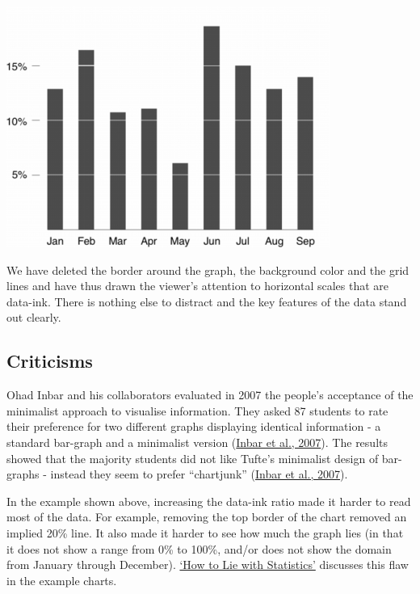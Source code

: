 \documentclass[
]{book}
\begin{document}
\includegraphics{imgs/high_data_ink_ratio.png}

We have deleted the border around the graph, the background color and the grid lines and have thus drawn the viewer's attention to horizontal scales that are data-ink. There is nothing else to distract and the key features of the data stand out clearly.

\hypertarget{criticisms}{%
\subsection{Criticisms}\label{criticisms}}

Ohad Inbar and his collaborators evaluated in 2007 the people's acceptance of the minimalist approach to visualise information. They asked 87 students to rate their preference for two different graphs displaying identical information - a standard bar-graph and a minimalist version (\href{http://portal.acm.org/citation.cfm?id=1362587}{Inbar et al., 2007}). The results showed that the majority students did not like Tufte's minimalist design of bar-graphs - instead they seem to prefer ``chartjunk'' (\href{http://portal.acm.org/citation.cfm?id=1362587}{Inbar et al., 2007}).

In the example shown above, increasing the data-ink ratio made it harder to read most of the data. For example, removing the top border of the chart removed an implied 20\% line. It also made it harder to see how much the graph lies (in that it does not show a range from 0\% to 100\%, and/or does not show the domain from January through December). \href{https://www.librarysearch.manchester.ac.uk/primo-explore/fulldisplay?docid=44MAN_ALMA_DS21134626320001631\&context=L\&vid=MU_NUI\&search_scope=BLENDED\&isFrbr=true\&tab=local\&lang=en_US}{`How to Lie with Statistics'} discusses this flaw in the example charts.
\end{document}
